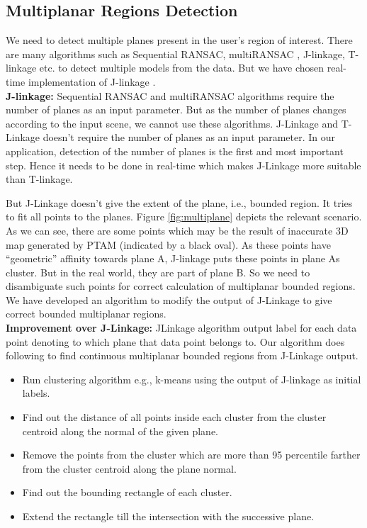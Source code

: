 \subsection{Multiplanar Regions Detection}
We need to detect multiple planes present in the user's region of
interest. There are many algorithms such as Sequential RANSAC\cite{Kanazawa},
multiRANSAC\cite{zuliani} , J-linkage\cite{jlinkage}, T-linkage\cite{tlinkage}
etc. to detect multiple models from the data. But we have chosen real-time
implementation of J-linkage \cite{realtimejlinkage}.\\
\textbf{J-linkage:} Sequential RANSAC and multiRANSAC algorithms require
the number of planes as an input parameter. But as the number of planes changes
according to the input scene, we cannot use these algorithms. J-Linkage and T-Linkage
doesn't require the number of planes as an input parameter. 
In our application, detection of the number of planes is the first and most
important step. Hence it needs to be done in real-time which makes J-Linkage
more suitable than T-linkage.

But J-Linkage doesn't give the extent of the plane, i.e., bounded
region. It tries to fit all points to the planes. Figure \ref{fig:multiplane}
depicts the relevant scenario. As we can see, there are some points which may
be the result of inaccurate 3D map generated by PTAM (indicated by a black oval).
As these points have ``geometric'' affinity towards plane A, J-linkage puts these
points in plane A\textquotesingle s cluster. But in the real world, they are part
of plane B.
So we need to disambiguate such points for correct calculation of multiplanar
bounded regions. We have developed an algorithm to modify the output of
J-Linkage to give correct bounded multiplanar regions.\\
\textbf{Improvement over J-Linkage:} JLinkage algorithm output label
for each data point denoting to which plane that data point belongs to. Our
algorithm does following to find continuous multiplanar bounded regions from J-Linkage
output.
\begin{itemize}
  \item Run clustering algorithm e.g., k-means using the output of J-linkage
  as initial labels.
  \item Find out the distance of all points inside each cluster from the cluster
  centroid along the normal of the given plane.
  \item Remove the points from the cluster which are more than 95 percentile
  farther from the cluster centroid along the plane normal.
  \item Find out the bounding rectangle of each cluster.
  \item Extend the rectangle till the intersection with the successive plane.
\end{itemize}

